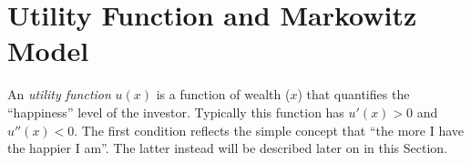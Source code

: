 %
%
%

\section{Utility Function and Markowitz Model}
\label{sec:markowitz_utility}

An \emph{utility function} $u(x)$ is a function of wealth ($x$) that quantifies the ``happiness'' level of the investor. Typically this function has $u'(x) > 0$ and $u''(x) < 0$. The first condition reflects the simple concept that ``the more I have the happier I am''. The latter instead will be described later on in this Section.

